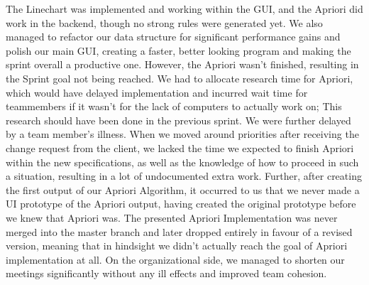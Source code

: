 The Linechart was implemented and working within the GUI, and the Apriori did work in the backend, though no strong rules were generated yet. We also managed to refactor our data structure for significant performance gains and polish our main GUI, creating a faster, better looking program and making the sprint overall a productive one. 
However, the Apriori wasn't finished, resulting in the Sprint goal not being reached. 
We had to allocate research time for Apriori, which would have delayed implementation and incurred wait time for teammembers if it wasn't for the lack of computers to actually work on; This research should have been done in the previous sprint. We were further delayed by a team member's illness.
When we moved around priorities after receiving the change request from the client, we lacked the time we expected to finish Apriori within the new specifications, as well as the knowledge of how to proceed in such a situation, resulting in a lot of undocumented extra work. 
Further, after creating the first output of our Apriori Algorithm, it occurred to us that we never made a UI prototype of the Apriori output, having created the original prototype before we knew that Apriori was.
The presented Apriori Implementation was never merged into the master branch and later dropped entirely in favour of a revised version, meaning that in hindsight we didn't actually reach the goal of Apriori implementation at all.
On the organizational side, we managed to shorten our meetings significantly without any ill effects and improved team cohesion.